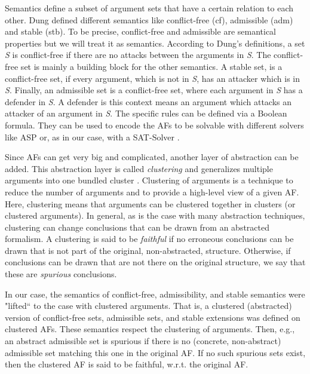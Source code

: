Semantics define a subset of argument sets that have a certain relation to each other. Dung defined different semantics \cite{Dung1995-DUNOTA-2} like conflict-free (cf), admissible (adm) and stable (stb). To be precise, conflict-free and admissible are semantical properties but we will treat it as semantics. According to Dung's definitions, a set \textit{S} is conflict-free if there are no attacks between the arguments in \textit{S}. The conflict-free set is mainly a building block for the other semantics.
A stable set, is a conflict-free set, if every argument, which is not in \textit{S}, has an attacker which is in \textit{S}.
Finally, an admissible set is a conflict-free set, where each argument in \textit{S} has a defender in \textit{S}. A defender is this context means an argument which attacks an attacker of an argument in \textit{S}.
The specific rules can be defined via a Boolean formula. They can be used to encode the AFs to be solvable with different solvers like \ac{ASP} \cite{DBLP:journals/corr/abs-1301-1388} or, as in our case, with a \ac{SAT-Solver} \cite{DBLP:journals/amai/AmgoudD13}.


Since AFs can get very big and complicated, another layer of abstraction can be added. This abstraction layer is called \emph{clustering} and generalizes multiple arguments into one bundled cluster \cite{DBLP:conf/kr/SaribaturW21}. Clustering of arguments is a technique to reduce the number of arguments and to provide a high-level view of a given AF. Here, clustering means that arguments can be clustered together in clusters (or clustered arguments). In general, as is the case with many abstraction techniques, clustering can change conclusions that can be drawn from an abstracted formalism. A clustering is said to be \emph{faithful} if no erroneous conclusions can be drawn that is not part of the original, non-abstracted, structure. Otherwise, if conclusions can be drawn that are not there on the original structure, we say that these are \emph{spurious} conclusions.

In our case, the semantics of conflict-free, admissibility, and stable semantics were "lifted`` to the case with clustered arguments. That is, a clustered (abstracted) version of conflict-free sets, admissible sets, and stable extensions was defined on clustered AFs. These semantics respect the clustering of arguments. Then, e.g., an abstract admissible set is spurious if there is no (concrete, non-abstract) admissible set matching this one in the original AF. If no such spurious sets exist, then the clustered AF is said to be faithful, w.r.t. the original AF.




